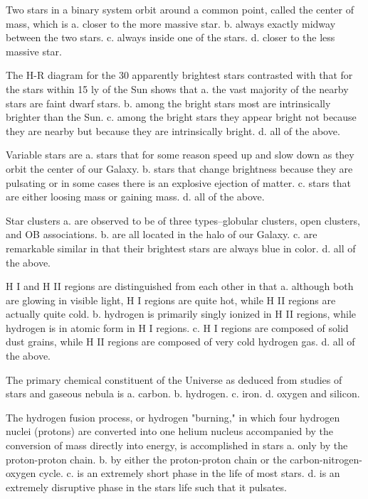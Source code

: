     Two stars in a binary system orbit around a common point, called the center of mass, which is
    a. closer to the more massive star.
    b. always exactly midway between the two stars.
    c. always inside one of the stars.
    d. closer to the less massive star.

    The H-R diagram for the 30 apparently brightest stars contrasted with that for the stars within 15 ly of the Sun shows that
    a. the vast majority of the nearby stars are faint dwarf stars.
    b. among the bright stars most are intrinsically brighter than the Sun.
    c. among the bright stars they appear bright not because they are nearby but because they are intrinsically bright.
    d. all of the above.

    Variable stars are
    a. stars that for some reason speed up and slow down as they orbit the center of our Galaxy.
    b. stars that change brightness because they are pulsating or in some cases there is an explosive ejection of matter.
    c. stars that are either loosing mass or gaining mass.
    d. all of the above.

    Star clusters
    a. are observed to be of three types--globular clusters, open clusters, and OB associations.
    b. are all located in the halo of our Galaxy.
    c. are remarkable similar in that their brightest stars are always blue in color.
    d. all of the above.

    H I and H II regions are distinguished from each other in that
    a. although both are glowing in visible light, H I regions are quite hot, while H II regions are actually quite cold.
    b. hydrogen is primarily singly ionized in H II regions, while hydrogen is in atomic form in H I regions.
    c. H I regions are composed of solid dust grains, while H II regions are composed of very cold hydrogen gas.
    d. all of the above.

    The primary chemical constituent of the Universe as deduced from studies of stars and gaseous nebula is
    a. carbon.
    b. hydrogen.
    c. iron.
    d. oxygen and silicon.

    The hydrogen fusion process, or hydrogen "burning," in which four hydrogen nuclei (protons) are converted into one helium nucleus accompanied by the conversion of mass directly into energy, is accomplished in stars
    a. only by the proton-proton chain.
    b. by either the proton-proton chain or the carbon-nitrogen-oxygen cycle.
    c. is an extremely short phase in the life of most stars.
    d. is an extremely disruptive phase in the stars life such that it pulsates.

